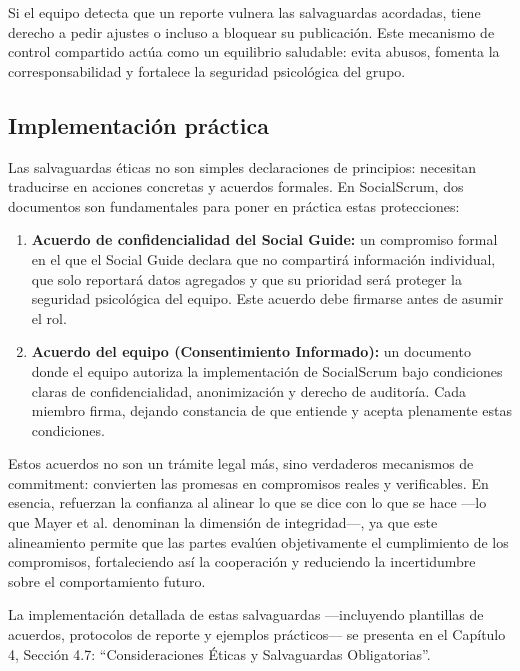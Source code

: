 Si el equipo detecta que un reporte vulnera las salvaguardas acordadas, tiene derecho a pedir ajustes o incluso a bloquear su publicación. Este mecanismo de control compartido actúa como un equilibrio saludable: evita abusos, fomenta la corresponsabilidad y fortalece la seguridad psicológica del grupo.

\subsection{Implementación práctica}

Las salvaguardas éticas no son simples declaraciones de principios: necesitan traducirse en acciones concretas y acuerdos formales. En SocialScrum, dos documentos son fundamentales para poner en práctica estas protecciones:

\begin{enumerate}
    \item \textbf{Acuerdo de confidencialidad del Social Guide:} un compromiso formal en el que el Social Guide declara que no compartirá información individual, que solo reportará datos agregados y que su prioridad será proteger la seguridad psicológica del equipo. Este acuerdo debe firmarse antes de asumir el rol.

    \item \textbf{Acuerdo del equipo (Consentimiento Informado):} un documento donde el equipo autoriza la implementación de SocialScrum bajo condiciones claras de confidencialidad, anonimización y derecho de auditoría. Cada miembro firma, dejando constancia de que entiende y acepta plenamente estas condiciones.

\end{enumerate}

Estos acuerdos no son un trámite legal más, sino verdaderos mecanismos de commitment: convierten las promesas en compromisos reales y verificables. En esencia, refuerzan la confianza al alinear lo que se dice con lo que se hace —lo que Mayer et al. \cite{mayer_integrative_1995} denominan la dimensión de integridad—, ya que este alineamiento permite que las partes evalúen objetivamente el cumplimiento de los compromisos, fortaleciendo así la cooperación y reduciendo la incertidumbre sobre el comportamiento futuro.

La implementación detallada de estas salvaguardas —incluyendo plantillas de acuerdos, protocolos de reporte y ejemplos prácticos— se presenta en el Capítulo 4, Sección 4.7: ``Consideraciones Éticas y Salvaguardas Obligatorias''.

